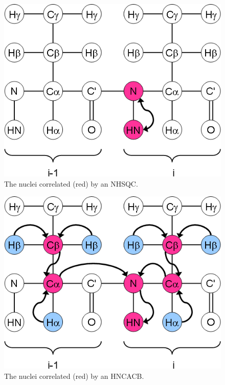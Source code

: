 \begin{figure}
  \includegraphics[scale=0.5]{figures/ccpn_nhsqc}
  \caption[The nuclei correlated by an NHSQC.]
          {The nuclei correlated (red) by an NHSQC.}
  \label{ccpn_nhsqc}
\end{figure}
\begin{figure}
  \includegraphics[scale=0.5]{figures/ccpn_hncacb}
  \caption[The nuclei correlated by an HNCACB.]
          {The nuclei correlated (red) by an HNCACB.}
  \label{ccpn_hncacb}
\end{figure}
